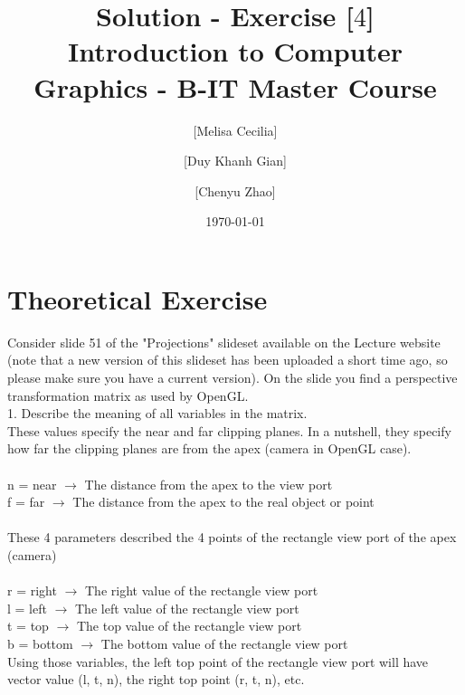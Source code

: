 \documentclass[10pt,a4paper]{article}
\begin{document}
\title{Solution - Exercise [$4$]\\
\small{Introduction to Computer Graphics - B-IT Master Course}}
\author{ [Melisa Cecilia] \and [Duy Khanh Gian] \and [Chenyu Zhao]}
\date{\today}
\maketitle

\section*{Theoretical Exercise}
Consider slide 51 of the "Projections" slideset available on the Lecture website (note that a new version of this slideset has been uploaded a short time ago, so please make sure you have a current version). On the slide you find a perspective transformation matrix as used by OpenGL.\\

1. Describe the meaning of all variables in the matrix. \\

These values specify the near and far clipping planes. In a nutshell, they specify how far the clipping planes are from the apex (camera in OpenGL case). \\ \\
n = near $\rightarrow$ The distance from the apex to the view port \\
f = far $\rightarrow$ The distance from the apex to the real object or point \\ \\

These 4 parameters described the 4 points of the rectangle view port of the apex (camera) \\ \\
r = right $\rightarrow$ The right value of the rectangle view port \\
l = left $\rightarrow$ The left value of the rectangle view port \\
t = top $\rightarrow$ The top value of the rectangle view port \\
b = bottom $\rightarrow$ The bottom value of the rectangle view port \\

Using those variables, the left top point of the rectangle view port will have vector value (l, t, n), the right top point (r, t, n), etc. \\ \\
\end{document}
